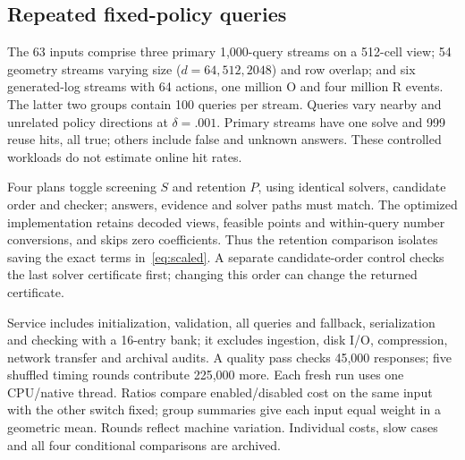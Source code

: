 \subsection{Repeated fixed-policy queries}
The 63 inputs comprise three primary 1,000-query streams on a 512-cell view; 54 geometry streams varying size ($d=64,512,2048$) and row overlap; and six generated-log streams with 64 actions, one million O and four million R events. The latter two groups contain 100 queries per stream. Queries vary nearby and unrelated policy directions at $\delta=.001$. Primary streams have one solve and 999 reuse hits, all true; others include false and unknown answers. These controlled workloads do not estimate online hit rates.

Four plans toggle screening $S$ and retention $P$, using identical solvers, candidate order and checker; answers, evidence and solver paths must match. The optimized implementation retains decoded views, feasible points and within-query number conversions, and skips zero coefficients. Thus the retention comparison isolates saving the exact terms in~\eqref{eq:scaled}. A separate candidate-order control checks the last solver certificate first; changing this order can change the returned certificate.

Service includes initialization, validation, all queries and fallback, serialization and checking with a 16-entry bank; it excludes ingestion, disk I/O, compression, network transfer and archival audits. A quality pass checks 45,000 responses; five shuffled timing rounds contribute 225,000 more. Each fresh run uses one CPU/native thread. Ratios compare enabled/disabled cost on the same input with the other switch fixed; group summaries give each input equal weight in a geometric mean. Rounds reflect machine variation. Individual costs, slow cases and all four conditional comparisons are archived.
